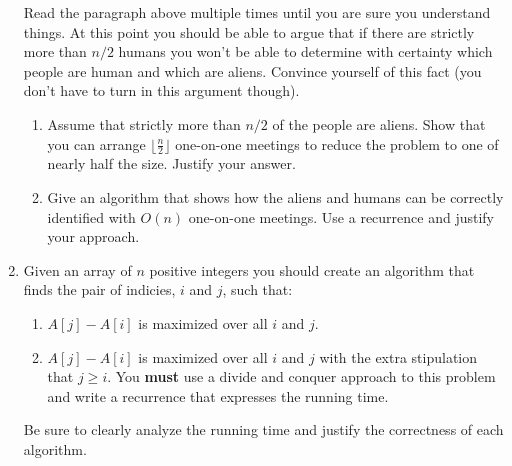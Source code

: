 \documentclass[11pt]{article}
\begin{document}
\begin{enumerate}[1.]
Read the paragraph above multiple times until you are sure you understand things.  At this point you should be able to argue that if there are strictly more than $n/2$ humans you won't be able to determine with certainty which people are human and which are aliens.  Convince yourself of this fact (you don't have to turn in this argument though).  

\begin{enumerate} 
\item  Assume that strictly more than $n/2$ of the people are aliens.  Show that you can arrange $\lfloor \frac{n}{2} \rfloor$ one-on-one meetings to reduce the problem to one of nearly half the size.  Justify your answer.  
\item  Give an algorithm that shows how the aliens and humans can be correctly identified with $O(n)$ one-on-one meetings. Use a recurrence and justify your approach.  
\end{enumerate} 

\item Given an array of $n$ positive integers you should create an algorithm that finds the pair of indicies, $i$ and $j$, such that:  

\begin{enumerate}
\item $A[j] - A[i]$ is maximized over all $i$ and $j$.  
\item $A[j] - A[i]$ is maximized over all $i$ and $j$ with the extra stipulation that $j \geq i$.  You \textbf{must} use a divide and conquer approach to this problem and write a recurrence that expresses the running time.  
\end{enumerate}

Be sure to clearly analyze the running time and justify the correctness of each algorithm. 

\end{enumerate}
\end{document}

